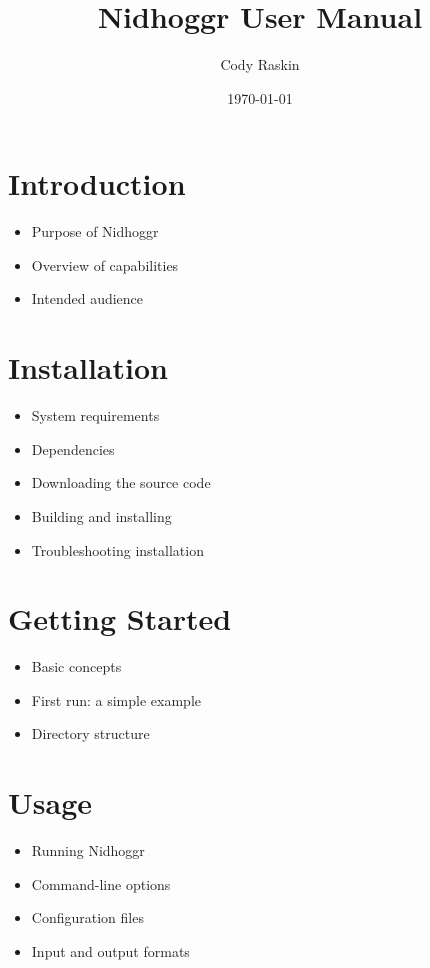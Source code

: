 \documentclass[12pt]{article}
\title{Nidhoggr User Manual}
\author{Cody Raskin}
\date{\today}
\begin{document}
	
	\maketitle
	
	\tableofcontents
	\newpage
	
	\section{Introduction}
	\begin{itemize}
		\item Purpose of Nidhoggr
		\item Overview of capabilities
		\item Intended audience
	\end{itemize}
	
	\section{Installation}
	\begin{itemize}
		\item System requirements
		\item Dependencies
		\item Downloading the source code
		\item Building and installing
		\item Troubleshooting installation
	\end{itemize}
	
	\section{Getting Started}
	\begin{itemize}
		\item Basic concepts
		\item First run: a simple example
		\item Directory structure
	\end{itemize}
	
	\section{Usage}
	\begin{itemize}
		\item Running Nidhoggr
		\item Command-line options
		\item Configuration files
		\item Input and output formats
	\end{itemize}
	
\end{document}

